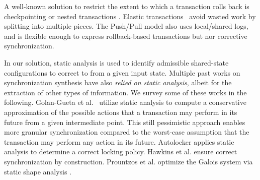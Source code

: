 %
A well-known solution to restrict the extent to which a transaction rolls back is checkpointing \cite{spaa08a,Egwutuoha:2013}
or nested transactions \cite{ont,beeri}.
Elastic transactions~\cite{FGG:DISC09} avoid wasted work by splitting into multiple pieces.  
%
The Push/Pull model \cite{KoskinenP15} also uses local/shared logs, and is flexible enough to express rollback-based transactions but nor corrective synchronization.

In our solution, static analysis is used to identify admissible shared-state configurations to correct to from a given input state. Multiple past works on synchronization synthesis have also \emph{relied on static analysis}, albeit for the extraction of other types of information. We survey some of these works in the following.
%
Golan-Gueta et al.~\cite{GRSY:PLDI13} utilize static analysis to compute a conservative approximation of the possible actions that a transaction may perform in its future from a given intermediate point. This still pessimistic approach enables more granular synchronization compared to the worst-case assumption that the transaction may perform any action in its future.
%
Autolocker \cite{popl/McCloskeyZGB06} applies static analysis to determine a correct locking policy.
%
Hawkins et al. \cite{HawkinsAFRS12}
ensure correct synchronization by construction.
%
Prountzos et al. \cite{PrountzosMPM11} optimize the Galois system \cite{Galois} via static shape analysis \cite{MoolyToplas}.





